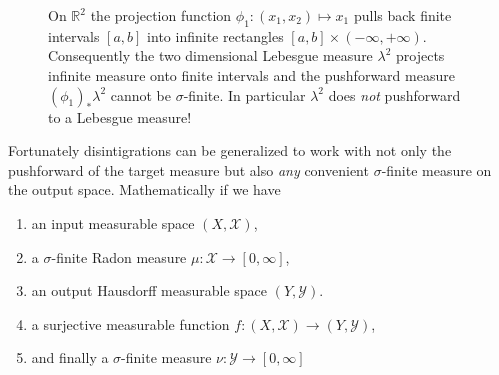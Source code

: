 \documentclass[
  letterpaper,
  DIV=11,
  numbers=noendperiod]{scrartcl}
\providecommand{\tightlist}{%
  \setlength{\itemsep}{0pt}\setlength{\parskip}{0pt}}\usepackage{longtable,booktabs,array}
\begin{document}
\begin{figure}


\caption{\label{fig-lebesgue-pushforward}On \(\mathbb{R}^{2}\) the
projection function \(\phi_{1} : (x_{1}, x_{2}) \mapsto x_{1}\) pulls
back finite intervals \([a, b]\) into infinite rectangles
\([a, b] \times (-\infty, +\infty)\). Consequently the two dimensional
Lebesgue measure \(\lambda^{2}\) projects infinite measure onto finite
intervals and the pushforward measure \((\phi_{1})_{*} \lambda^{2}\)
cannot be \(\sigma\)-finite. In particular \(\lambda^{2}\) does
\emph{not} pushforward to a Lebesgue measure!}

\end{figure}%

Fortunately disintigrations can be generalized to work with not only the
pushforward of the target measure but also \emph{any} convenient
\(\sigma\)-finite measure on the output space. Mathematically if we have

\begin{enumerate}
\def\labelenumi{\arabic{enumi}.}
\tightlist
\item
  an input measurable space \((X, \mathcal{X})\),
\item
  a \(\sigma\)-finite Radon measure
  \(\mu : \mathcal{X} \rightarrow [0, \infty]\),
\item
  an output Hausdorff measurable space \((Y, \mathcal{Y})\).
\item
  a surjective measurable function
  \(f: (X, \mathcal{X}) \rightarrow (Y, \mathcal{Y})\),
\item
  and finally a \(\sigma\)-finite measure
  \(\nu : \mathcal{Y} \rightarrow [0, \infty]\)
\end{enumerate}
\end{document}
